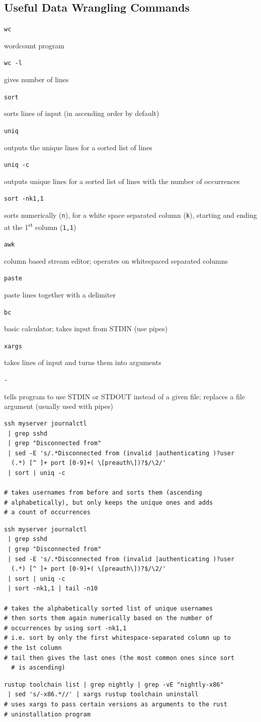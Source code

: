 \documentclass[letterpaper,12pt]{article}
\newcommand*{\lstitem}[1]{
  \setbox0\hbox{\lstinline{#1}}
  \item[\usebox0]
}
\begin{document}
\subsection{Useful Data Wrangling Commands}
\begin{description}
 \lstitem{wc} wordcount program
 \lstitem{wc -l} gives number of lines
 \lstitem{sort} sorts lines of input (in ascending order by default)
 \lstitem{uniq} outputs the unique lines for a sorted list of lines
 \lstitem{uniq -c} outputs unique lines for a sorted list of lines with the number of occurrences
 \lstitem{sort -nk1,1} sorts numerically (\lstinline{n}), for a white space separated column (\lstinline{k}), starting and ending at the 1\textsuperscript{st} column (\lstinline{1,1})
 \lstitem{awk} column based stream editor; operates on whitespaced separated columns
 \lstitem{paste} paste lines together with a delimiter
 \lstitem{bc} basic calculator; takes input from STDIN (use pipes)
 \lstitem{xargs} takes lines of input and turns them into arguments
 \lstitem{-} tells program to use STDIN or STDOUT instead of a given file; replaces a file argument (usually used with pipes)
\end{description}

\begin{lstlisting}
ssh myserver journalctl
 | grep sshd
 | grep "Disconnected from"
 | sed -E 's/.*Disconnected from (invalid |authenticating )?user
  (.*) [^ ]+ port [0-9]+( \[preauth\])?$/\2/'
 | sort | uniq -c

# takes usernames from before and sorts them (ascending
# alphabetically), but only keeps the unique ones and adds
# a count of occurrences
\end{lstlisting}

\begin{lstlisting}
ssh myserver journalctl
 | grep sshd
 | grep "Disconnected from"
 | sed -E 's/.*Disconnected from (invalid |authenticating )?user
  (.*) [^ ]+ port [0-9]+( \[preauth\])?$/\2/'
 | sort | uniq -c
 | sort -nk1,1 | tail -n10

# takes the alphabetically sorted list of unique usernames
# then sorts them again numerically based on the number of
# occurrences by using sort -nk1,1
# i.e. sort by only the first whitespace-separated column up to
# the 1st column
# tail then gives the last ones (the most common ones since sort
  # is ascending)
\end{lstlisting}

\begin{lstlisting}
rustup toolchain list | grep nightly | grep -vE "nightly-x86"
 | sed 's/-x86.*//' | xargs rustup toolchain uninstall
# uses xargs to pass certain versions as arguments to the rust
# uninstallation program
\end{lstlisting}
\end{document}
